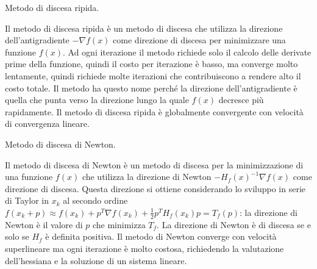 \documentclass[answers, a4paper]{exam}
\begin{document}
\begin{questions}
\begin{solution}
\end{solution}
\question Metodo di discesa ripida.
\begin{solution}
	Il metodo di discesa ripida è un metodo di discesa che utilizza la direzione dell'antigradiente $-\nabla f(x)$ come direzione di discesa per minimizzare una funzione $f(x)$.
	Ad ogni iterazione il metodo richiede solo il calcolo delle derivate prime della funzione, quindi il costo per iterazione è basso, ma converge molto lentamente, quindi richiede molte iterazioni che contribuiscono a rendere alto il costo totale. 
	Il metodo ha questo nome perché la direzione dell'antigradiente è quella che punta verso la direzione lungo la quale $f(x)$ decresce più rapidamente. 
	Il metodo di discesa ripida è globalmente convergente con velocità di convergenza lineare.
\end{solution}
\question Metodo di discesa di Newton.
\begin{solution}
	Il metodo di discesa di Newton è un metodo di discesa per la minimizzazione di una funzione $f(x)$ che utilizza la direzione di Newton $-H_f(x)^{-1} \nabla f(x)$ come direzione di discesa.
	Questa direzione si ottiene considerando lo sviluppo in serie di Taylor in $x_k$ al secondo ordine $f(x_k + p) \approx f(x_k) + p^T \nabla f(x_k) + \frac{1}{2} p^T H_f(x_k) p = T_f(p)$: la direzione di Newton è il valore di $p$ che minimizza $T_f$. 
	La direzione di Newton è di discesa se e solo se $H_f$ è definita positiva.
	Il metodo di Newton converge con velocità superlineare ma ogni iterazione è molto costosa, richiedendo la valutazione dell'hessiana e la soluzione di un sistema lineare. 
\end{solution}


\end{questions}
\end{document}
